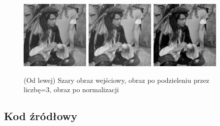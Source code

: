 \documentclass[final,a4paper,openany,12pt]{mwbk}
\begin{document}
\begin{figure}[H]
	\begin{center}
		\includegraphics[width=0.3\textwidth]{2/2Gray_Div_Original}
		\includegraphics[width=0.3\textwidth]{2/2Gray_Div_Result}
		\includegraphics[width=0.3\textwidth]{2/2Gray_Div_Result_Norm}
	\end{center}
	\caption{(Od lewej) Szary obraz wejściowy, obraz po podzieleniu przez liczbę=3, obraz po normalizacji }
\end{figure}

\subsection*{Kod źródłowy}
\end{document}

